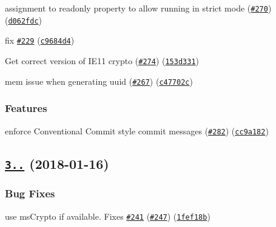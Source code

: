 \begin{DoxyItemize}
\item assignment to readonly property to allow running in strict mode (\href{https://github.com/kelektiv/node-uuid/issues/270}{\tt \#270}) (\href{https://github.com/kelektiv/node-uuid/commit/d062fdc}{\tt d062fdc})
\item fix \href{https://github.com/kelektiv/node-uuid/issues/229}{\tt \#229} (\href{https://github.com/kelektiv/node-uuid/commit/c9684d4}{\tt c9684d4})
\item Get correct version of I\+E11 crypto (\href{https://github.com/kelektiv/node-uuid/issues/274}{\tt \#274}) (\href{https://github.com/kelektiv/node-uuid/commit/153d331}{\tt 153d331})
\item mem issue when generating uuid (\href{https://github.com/kelektiv/node-uuid/issues/267}{\tt \#267}) (\href{https://github.com/kelektiv/node-uuid/commit/c47702c}{\tt c47702c})
\end{DoxyItemize}

\subsubsection*{Features}


\begin{DoxyItemize}
\item enforce Conventional Commit style commit messages (\href{https://github.com/kelektiv/node-uuid/issues/282}{\tt \#282}) (\href{https://github.com/kelektiv/node-uuid/commit/cc9a182}{\tt cc9a182})
\end{DoxyItemize}

\label{_3.2.1}%
 \subsection*{\href{https://github.com/kelektiv/node-uuid/compare/v3.2.0...v3.2.1}{\tt 3..} (2018-\/01-\/16)}

\subsubsection*{Bug Fixes}


\begin{DoxyItemize}
\item use ms\+Crypto if available. Fixes \href{https://github.com/kelektiv/node-uuid/issues/241}{\tt \#241} (\href{https://github.com/kelektiv/node-uuid/issues/247}{\tt \#247}) (\href{https://github.com/kelektiv/node-uuid/commit/1fef18b}{\tt 1fef18b})
\end{DoxyItemize}

